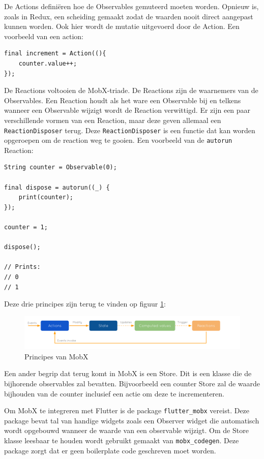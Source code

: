 De Actions definiëren hoe de Observables gemuteerd moeten worden. Opnieuw is, zoals in Redux, een scheiding gemaakt zodat de waarden nooit direct aangepast kunnen worden. Ook hier wordt de mutatie uitgevoerd door de Action.
Een voorbeeld van een action:
\begin{verbatim}
final increment = Action((){
    counter.value++;
});    
\end{verbatim}

De Reactions voltooien de MobX-triade. De Reactions zijn de waarnemers van de Observables. Een Reaction houdt als het ware een Observable bij en telkens wanneer een Observable wijzigt wordt de Reaction verwittigd. Er zijn een paar verschillende vormen van een Reaction, maar deze geven allemaal een \verb|ReactionDisposer| terug. Deze \verb|ReactionDisposer| is een functie dat kan worden opgeroepen om de reaction weg te gooien. Een voorbeeld van de \verb|autorun| Reaction:
\begin{verbatim}
String counter = Observable(0);

final dispose = autorun((_) {
    print(counter);
});

counter = 1;

dispose();

// Prints:
// 0
// 1
\end{verbatim}

Deze drie principes zijn terug te vinden op figuur \ref{fig:mobx-principles}:

\begin{figure}[H]
    \centering
    \includegraphics[width=\linewidth]{img/stand-van-zaken/mobx-principles.png}
    \caption{Principes van MobX \autocite{MobX2019}}
    \label{fig:mobx-principles}
\end{figure}

Een ander begrip dat terug komt in MobX is een Store. Dit is een klasse die de bijhorende observables zal bevatten. Bijvoorbeeld een counter Store zal de waarde bijhouden van de counter inclusief een actie om deze te incrementeren.

Om MobX te integreren met Flutter is de package \verb|flutter_mobx| vereist. Deze package bevat tal van handige widgets zoals een Observer widget die automatisch wordt opgebouwd wanneer de waarde van een observable wijzigt. 
Om de Store klasse leesbaar te houden wordt gebruikt gemaakt van \verb|mobx_codegen|. Deze package zorgt dat er geen boilerplate code geschreven moet worden. 
